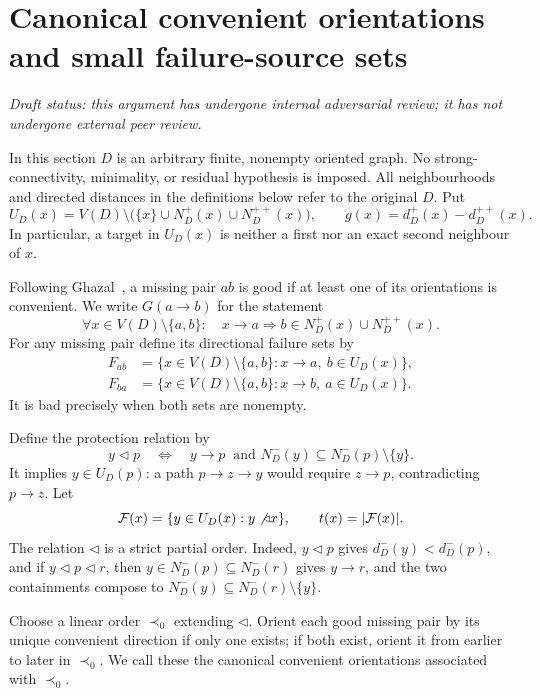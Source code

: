 \section{Canonical convenient orientations and small failure-source sets}
\label{sec:small-failure-sources}

\noindent\emph{Draft status: this argument has undergone internal
adversarial review; it has not undergone external peer review.}

In this section $D$ is an arbitrary finite, nonempty oriented graph.
No strong-connectivity, minimality, or residual hypothesis is imposed.
All neighbourhoods and directed distances in the definitions below
refer to the original $D$. Put
\[
 U_D(x)=V(D)\setminus\bigl(\{x\}\cup N_D^+(x)\cup N_D^{++}(x)\bigr),
 \qquad g(x)=d_D^+(x)-d_D^{++}(x).
\]
In particular, a target in $U_D(x)$ is neither a first nor an exact
second neighbour of $x$.

Following Ghazal~\cite[Definition~1]{Ghazal2012}, a missing pair $ab$
is good if at least one of its orientations is convenient. We write
$G(a\to b)$ for the statement
\[
 \forall x\in V(D)\setminus\{a,b\}:\quad
 x\to a\Longrightarrow b\in N_D^+(x)\cup N_D^{++}(x).
\]
For any missing pair define its directional failure sets by
\[
 \begin{aligned}
 F_{ab}&=\{x\in V(D)\setminus\{a,b\}:x\to a,\ b\in U_D(x)\},\\
 F_{ba}&=\{x\in V(D)\setminus\{a,b\}:x\to b,\ a\in U_D(x)\}.
 \end{aligned}
\]
It is bad precisely when both sets are nonempty.

Define the protection relation by
\[
 y\triangleleft p
 \quad\Longleftrightarrow\quad
 y\to p\ \text{ and }
 N_D^-(y)\subseteq N_D^-(p)\setminus\{y\}.
\]
It implies $y\in U_D(p)$: a path $p\to z\to y$ would require
$z\to p$, contradicting $p\to z$. Let
\[
 \mathcal F(x)=\{y\in U_D(x):y\not\triangleleft x\},
 \qquad t(x)=|\mathcal F(x)|.
\]
The relation $\triangleleft$ is a strict partial order. Indeed,
$y\triangleleft p$ gives $d_D^-(y)<d_D^-(p)$, and if
$y\triangleleft p\triangleleft r$, then
$y\in N_D^-(p)\subseteq N_D^-(r)$ gives $y\to r$, and the
two containments compose to
$N_D^-(y)\subseteq N_D^-(r)\setminus\{y\}$.

Choose a linear order $\prec_0$ extending $\triangleleft$. Orient each
good missing pair by its unique convenient direction if only one
exists; if both exist, orient it from earlier to later in $\prec_0$.
We call these the canonical convenient orientations associated with
$\prec_0$.

